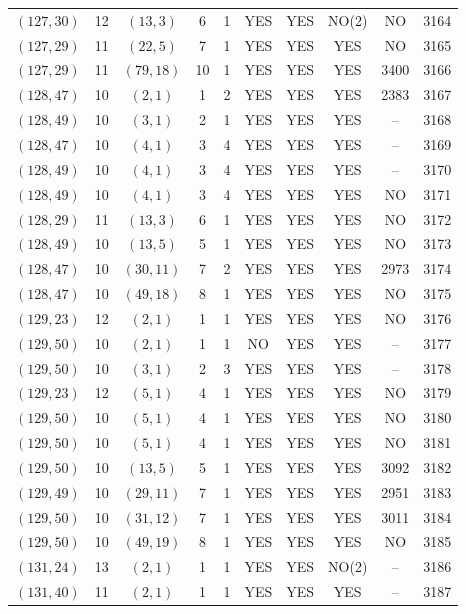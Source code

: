 \begin{longtable}{|c|c|c|c|c|c|c|c|c|c|}
$(127, 30)$ & 12 & $(13, 3)$ & 6 & 1 & YES & YES & NO(2) & NO & 3164\\
$(127, 29)$ & 11 & $(22, 5)$ & 7 & 1 & YES & YES & YES & NO & 3165\\
$(127, 29)$ & 11 & $(79, 18)$ & 10 & 1 & YES & YES & YES & 3400 & 3166\\
$(128, 47)$ & 10 & $(2, 1)$ & 1 & 2 & YES & YES & YES & 2383 & 3167\\
$(128, 49)$ & 10 & $(3, 1)$ & 2 & 1 & YES & YES & YES & -- & 3168\\
$(128, 47)$ & 10 & $(4, 1)$ & 3 & 4 & YES & YES & YES & -- & 3169\\
$(128, 49)$ & 10 & $(4, 1)$ & 3 & 4 & YES & YES & YES & -- & 3170\\
$(128, 49)$ & 10 & $(4, 1)$ & 3 & 4 & YES & YES & YES & NO & 3171\\
$(128, 29)$ & 11 & $(13, 3)$ & 6 & 1 & YES & YES & YES & NO & 3172\\
$(128, 49)$ & 10 & $(13, 5)$ & 5 & 1 & YES & YES & YES & NO & 3173\\
$(128, 47)$ & 10 & $(30, 11)$ & 7 & 2 & YES & YES & YES & 2973 & 3174\\
$(128, 47)$ & 10 & $(49, 18)$ & 8 & 1 & YES & YES & YES & NO & 3175\\
$(129, 23)$ & 12 & $(2, 1)$ & 1 & 1 & YES & YES & YES & NO & 3176\\
$(129, 50)$ & 10 & $(2, 1)$ & 1 & 1 & NO & YES & YES & -- & 3177\\
$(129, 50)$ & 10 & $(3, 1)$ & 2 & 3 & YES & YES & YES & -- & 3178\\
$(129, 23)$ & 12 & $(5, 1)$ & 4 & 1 & YES & YES & YES & NO & 3179\\
$(129, 50)$ & 10 & $(5, 1)$ & 4 & 1 & YES & YES & YES & NO & 3180\\
$(129, 50)$ & 10 & $(5, 1)$ & 4 & 1 & YES & YES & YES & NO & 3181\\
$(129, 50)$ & 10 & $(13, 5)$ & 5 & 1 & YES & YES & YES & 3092 & 3182\\
$(129, 49)$ & 10 & $(29, 11)$ & 7 & 1 & YES & YES & YES & 2951 & 3183\\
$(129, 50)$ & 10 & $(31, 12)$ & 7 & 1 & YES & YES & YES & 3011 & 3184\\
$(129, 50)$ & 10 & $(49, 19)$ & 8 & 1 & YES & YES & YES & NO & 3185\\
$(131, 24)$ & 13 & $(2, 1)$ & 1 & 1 & YES & YES & NO(2) & -- & 3186\\
$(131, 40)$ & 11 & $(2, 1)$ & 1 & 1 & YES & YES & YES & -- & 3187\\

\end{longtable}
